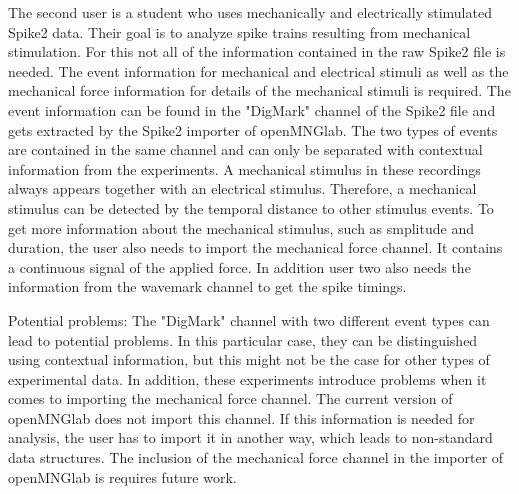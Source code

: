 The second user is a student who uses mechanically and electrically stimulated Spike2 data. Their goal is to analyze spike trains resulting from mechanical stimulation. For this not all of the information contained in the raw Spike2 file is needed. The event information for mechanical and electrical stimuli as well as the mechanical force information for details of the mechanical stimuli is required. The event information can be found in the "DigMark" channel of the Spike2 file and gets extracted by the Spike2 importer of openMNGlab. The two types of events are contained in the same channel and can only be separated with contextual information from the experiments. A mechanical stimulus in these recordings always appears together with an electrical stimulus. Therefore, a mechanical stimulus can be detected by the temporal distance to other stimulus events.
To get more information about the mechanical stimulus, such as smplitude and duration, the user also needs to import the mechanical force channel. It contains a continuous signal of the applied force. In addition user two also needs the information from the wavemark channel to get the spike timings.

Potential problems: The "DigMark" channel with two different event types can lead to potential problems. In this particular case, they can be distinguished using contextual information, but this might not be the case for other types of experimental data. In addition, these experiments introduce problems when it comes to importing the mechanical force channel. The current version of openMNGlab does not import this channel. If this information is needed for analysis, the user has to import it in another way, which leads to non-standard data structures. The inclusion of the mechanical force channel in the importer of openMNGlab is requires future work.

